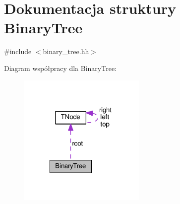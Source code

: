 \hypertarget{struct_binary_tree}{\section{Dokumentacja struktury Binary\-Tree}
\label{struct_binary_tree}
}


{\ttfamily \#include $<$binary\-\_\-tree.\-hh$>$}



Diagram współpracy dla Binary\-Tree\-:\nopagebreak
\begin{figure}[H]
\begin{center}
\leavevmode
\includegraphics[width=174pt]{struct_binary_tree__coll__graph}
\end{center}
\end{figure}
